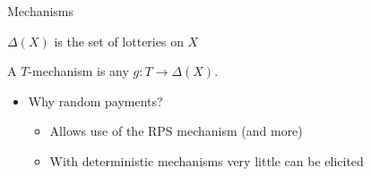 %
%
%
%
%
%
%
%
%
%
%
%
%
\begin{frame}{Mechanisms}{}

$\Delta(X)$ is the set of lotteries on $X$ %

\bigskip

\begin{definition}
A $T$-mechanism is any $g:T\to \Delta(X)$.
\end{definition}

\bigskip

\begin{itemize}

\item Why random payments?
\begin{itemize}
  \item Allows use of the RPS mechanism (and more)
  \item With deterministic mechanisms very little can be elicited
\end{itemize}
\end{itemize}
\medskip


\end{frame}


